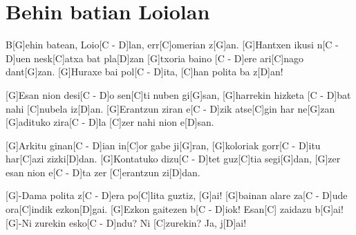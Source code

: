 \section{Behin batian Loiolan}
\begin{guitar}
\begin{multicols}{2}
B[G]ehin batean, Loio[C - D]lan,
err[C]omerian z[G]an.
[G]Hantxen ikusi n[C - D]uen
nesk[C]atxa bat pla[D]zan
[G]txoria baino [C - D]ere
ari[C]nago dant[G]zan.
[G]Huraxe bai pol[C - D]ita,
[C]han polita ba z[D]an!


[G]Esan nion desi[C - D]o
sen[C]ti nuben gi[G]san,
[G]harrekin hizketa [C - D]bat
nahi [C]nubela iz[D]an.
[G]Erantzun ziran e[C - D]zik
atse[C]gin har ne[G]zan
[G]adituko zira[C - D]la
[C]zer nahi nion e[D]san.


[G]Arkitu ginan[C - D]ian
in[C]or gabe ji[G]ran,
[G]koloriak gorr[C - D]itu
har[C]azi zizki[D]dan.
[G]Kontatuko dizu[C - D]tet
guz[C]tia segi[G]dan,
[G]zer esan nion e[C - D]ta
zer [C]erantzun zi[D]dan.


[G]-Dama polita z[C - D]era
po[C]lita guztiz, [G]ai!
[G]bainan alare za[C - D]ude
ora[C]indik ezkon[D]gai.
[G]Ezkon gaitezen b[C - D]iok!
Esan[C] zaidazu b[G]ai!
[G]-Ni zurekin esko[C - D]ndu?
Ni [C]zurekin? Ja, j[D]ai!
\end{multicols}
\end{guitar}
